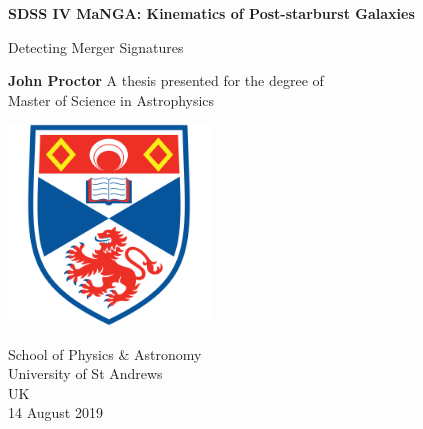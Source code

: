 
\begin{titlepage}
   \begin{center}
       \vspace*{1cm}
        
       \Huge
       \textbf{SDSS IV MaNGA: Kinematics of Post-starburst Galaxies}
 
       \vspace{0.5cm}
       \LARGE
       Detecting Merger Signatures
       \vspace{1.5cm}
 
       \textbf{John Proctor}
       \vfill
       A thesis presented for the degree of\\
       Master of Science in Astrophysics
 
       \vspace{0.8cm}
 
       \includegraphics[width=0.4\textwidth]{images/University-of-st-andrews-shield.png}
       
       \Large
       School of Physics \& Astronomy\\
       University of St Andrews\\
       UK\\
       14 August 2019
   \end{center}
   
   
\end{titlepage}





